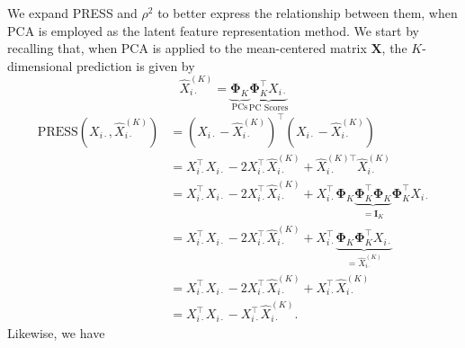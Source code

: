 We expand PRESS and $\rho^2$ to better express the relationship between them, when PCA is employed as the latent feature representation method. 
We start by recalling that, when PCA is applied to the mean-centered matrix $\mathbf{X}$, the $K$-dimensional prediction is given by 
$$
\widehat{X}^{(K)}_{i\cdot} = \underbrace{\boldsymbol{\Phi}_K}_{\text{PCs}} \underbrace{\boldsymbol{\Phi}_K^\top X_{i\cdot}}_{\text{PC Scores}}
$$
\begin{align*}
    \text{PRESS}\left(X_{i\cdot}, \widehat{X}^{(K)}_{i\cdot}\right) &= \left(X_{i\cdot} - \widehat{X}^{(K)}_{i\cdot}\right)^\top \left(X_{i\cdot} - \widehat{X}^{(K)}_{i\cdot}\right) \\
    &= 
    X_{i\cdot}^\top X_{i\cdot} - 2 X_{i\cdot}^\top \widehat{X}^{(K)}_{i\cdot} + \widehat{X}^{(K)\top}_{i\cdot} \widehat{X}^{(K)}_{i\cdot} \\
    &= X_{i\cdot}^\top X_{i\cdot} - 2 X_{i\cdot}^\top \widehat{X}^{(K)}_{i\cdot} + X_{i\cdot}^\top \boldsymbol{\Phi}_K \underbrace{\boldsymbol{\Phi}_K^\top \boldsymbol{\Phi}_K}_{= \mathbf{I}_K} \boldsymbol{\Phi}_K^\top X_{i\cdot} \\
    &=  X_{i\cdot}^\top X_{i\cdot} - 2 X_{i\cdot}^\top \widehat{X}^{(K)}_{i\cdot} + X_{i\cdot}^\top \underbrace{\boldsymbol{\Phi}_K \boldsymbol{\Phi}_K^\top X_{i\cdot}}_{=\widehat{X}^{(K)}_{i\cdot}} \\
    &= X_{i\cdot}^\top X_{i\cdot} - 2 X_{i\cdot}^\top \widehat{X}^{(K)}_{i\cdot} + X_{i\cdot}^\top \widehat{X}^{(K)}_{i\cdot} \\
    &= X_{i\cdot}^\top X_{i\cdot} - X_{i\cdot}^\top \widehat{X}^{(K)}_{i\cdot}.
\end{align*}
Likewise, we have 
